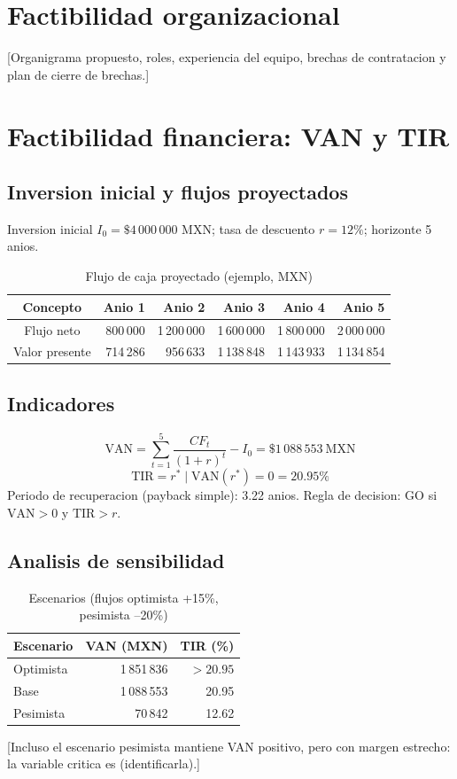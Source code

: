 \documentclass[12pt]{article}
\newcommand{\InversionInicial}{4\,000\,000}
\newcommand{\TasaDescuento}{12}
\newcommand{\VANbase}{1\,088\,553}
\newcommand{\TIRbase}{20.95}
\newcommand{\Payback}{3.22}
\newcommand{\VANoptimista}{1\,851\,836}
\newcommand{\VANpesimista}{70\,842}
\newcommand{\TIRpesimista}{12.62}
\newcommand{\Moneda}{MXN}
\begin{document}
\section{Factibilidad organizacional}
[Organigrama propuesto, roles, experiencia del equipo, brechas de
contratacion y plan de cierre de brechas.]

\section{Factibilidad financiera: VAN y TIR}
\subsection{Inversion inicial y flujos proyectados}
Inversion inicial \(I_0 = \$\InversionInicial{}\) \Moneda{}; tasa de
descuento \(r = \TasaDescuento{}\%\); horizonte 5 anios.
\begin{table}[h]
  \centering
  \caption{Flujo de caja proyectado (ejemplo, \Moneda{})}
  \label{tab:flujos}
  \begin{tabular}{crrrrr}
    \toprule
    Concepto & Anio 1 & Anio 2 & Anio 3 & Anio 4 & Anio 5 \\
    \midrule
    Flujo neto & 800\,000 & 1\,200\,000 & 1\,600\,000 & 1\,800\,000 & 2\,000\,000 \\
    Valor presente & 714\,286 & 956\,633 & 1\,138\,848 & 1\,143\,933 & 1\,134\,854 \\
    \bottomrule
  \end{tabular}
\end{table}
\subsection{Indicadores}
\begin{equation}
  \mathrm{VAN} = \sum_{t=1}^{5}\frac{CF_t}{(1+r)^t} - I_0
  = \$\VANbase{}\ \text{\Moneda{}}
  \label{eq:van}
\end{equation}
\begin{equation}
  \mathrm{TIR} = r^* \mid \mathrm{VAN}(r^*) = 0 = \TIRbase{}\%
  \label{eq:tir}
\end{equation}
Periodo de recuperacion (payback simple): \Payback{} anios.
Regla de decision: GO si \(\mathrm{VAN} > 0\) y \(\mathrm{TIR} > r\).
\subsection{Analisis de sensibilidad}
\begin{table}[h]
  \centering
  \caption{Escenarios (flujos optimista +15\%, pesimista --20\%)}
  \begin{tabular}{lrr}
    \toprule
    Escenario & VAN (\Moneda{}) & TIR (\%) \\
    \midrule
    Optimista & \VANoptimista{} & $> \TIRbase{}$ \\
    Base & \VANbase{} & \TIRbase{} \\
    Pesimista & \VANpesimista{} & \TIRpesimista{} \\
    \bottomrule
  \end{tabular}
\end{table}
[Incluso el escenario pesimista mantiene VAN positivo, pero con margen
estrecho: la variable critica es (identificarla).]
\end{document}
